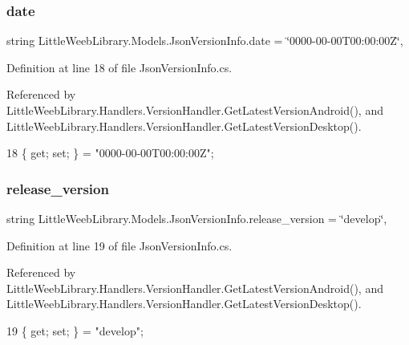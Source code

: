 \subsubsection{\texorpdfstring{date}{date}}
{\footnotesize\ttfamily string Little\+Weeb\+Library.\+Models.\+Json\+Version\+Info.\+date = \char`\"{}0000-\/00-\/00\+T00\+:00\+:00\+Z\char`\"{}\hspace{0.3cm}{\ttfamily [get]}, {\ttfamily [set]}}



Definition at line 18 of file Json\+Version\+Info.\+cs.



Referenced by Little\+Weeb\+Library.\+Handlers.\+Version\+Handler.\+Get\+Latest\+Version\+Android(), and Little\+Weeb\+Library.\+Handlers.\+Version\+Handler.\+Get\+Latest\+Version\+Desktop().


\begin{DoxyCode}
18 \{ \textcolor{keyword}{get}; \textcolor{keyword}{set}; \} = \textcolor{stringliteral}{"0000-00-00T00:00:00Z"};
\end{DoxyCode}
\mbox{\label{class_little_weeb_library_1_1_models_1_1_json_version_info_aeb4d9fe589655ec2dacff95ffcae154b}} 
\subsubsection{\texorpdfstring{release\+\_\+version}{release\_version}}
{\footnotesize\ttfamily string Little\+Weeb\+Library.\+Models.\+Json\+Version\+Info.\+release\+\_\+version = \char`\"{}develop\char`\"{}\hspace{0.3cm}{\ttfamily [get]}, {\ttfamily [set]}}



Definition at line 19 of file Json\+Version\+Info.\+cs.



Referenced by Little\+Weeb\+Library.\+Handlers.\+Version\+Handler.\+Get\+Latest\+Version\+Android(), and Little\+Weeb\+Library.\+Handlers.\+Version\+Handler.\+Get\+Latest\+Version\+Desktop().


\begin{DoxyCode}
19 \{ \textcolor{keyword}{get}; \textcolor{keyword}{set}; \} = \textcolor{stringliteral}{"develop"};
\end{DoxyCode}
\mbox{\label{class_little_weeb_library_1_1_models_1_1_json_version_info_a4da32a9d061542e9dd0302fa439e9913}} 
